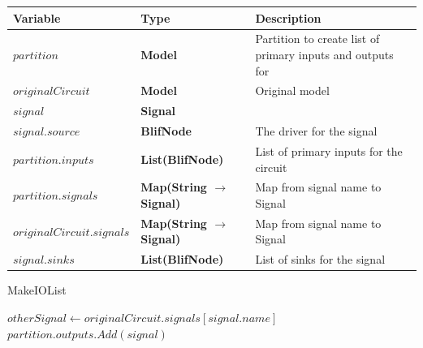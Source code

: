 \documentclass[12pt,final,oneside]{dwThesis} %
\begin{document}
   \begin{algorithm}

      \begin{center}

         \begin{tabularx}
            {\linewidth}{llX} \toprule
            Variable & Type & Description\\
            \midrule $partition$ &\textbf{Model } &  Partition to create list of primary inputs and
            outputs for\\
            $originalCircuit$ &\textbf{Model } &  Original
            model \\
            $signal$ &\textbf{Signal } &  \\
            $signal.source$
            &\textbf{BlifNode } &  The driver for the signal \\

            $partition.inputs$ &\textbf{List(BlifNode) } &  List of primary
            inputs for the circuit \\
            $partition.signals$ &\textbf{Map(String
               $\to$ Signal) } &  Map from signal name to Signal \\

            $originalCircuit.signals$ &\textbf{Map(String $\to$ Signal) } &
            Map from signal name to Signal \\
            $signal.sinks$ &\textbf{List(BlifNode) } &  List of sinks for the signal \\


            \bottomrule 
         \end{tabularx}

      \end{center}

      \caption{MakeIOList}\label{makeiolist} 
      \begin{algorithmic}[1]
             
         \EndIf 
         \State $otherSignal \gets originalCircuit.signals[signal.name]$
         \State $partition.outputs.Add(signal)$
         \EndIf \EndFor \EndProcedure 
      \end{algorithmic}

   \end{algorithm}
\end{document}
